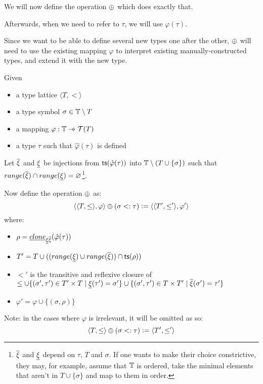 \documentclass[main.tex]{subfiles}
\begin{document}
We will now define the operation $\oplus$ which does exactly that.

Afterwards, when we need to refer to $\tau$, we will use $\varphi(\tau)$.

Since we want to be able to define several new types one after the other,
$\oplus$ will need to use the existing mapping $\varphi$ to interpret
existing manually-constructed types, and extend it with the new type.
\begin{defn}
    \label{def:subadd}
    Given
    \begin{itemize}
        \item a type lattice $\langle T, \less \rangle$
        \item a type symbol $\sigma \in \mathbb{T} \setminus T$
        \item a mapping $\varphi : \tsymbs \pfun \tclos{T}$
        \item a type $\tau$ such that $\hat{\varphi}(\tau)$ is defined
    \end{itemize}
    Let $\overline{\xi}$ and $\underline{\xi}$ be injections from
    $\mathsf{ts}(\hat{\varphi}(\tau))$ into $\mathbb{T} \setminus (T \cup \{ \sigma \})$ such that
    $range(\overline{\xi}) \cap range(\underline{\xi}) = \varnothing$\footnote{
        $\overline{\xi}$ and $\underline{\xi}$ depend on $\tau$, $T$ and
        $\sigma$. If one wants to make their choice constrictive, they may,
        for example, assume that $\mathbb{T}$ is ordered, take the minimal
        elements that aren't in $T \cup \{ \sigma \}$ and map to them in
        order.
    }.

    Now define the operation $\oplus$ as:
        \[ \langle \langle T, \leq \rangle, \varphi \rangle
            \oplus (\sigma <: \tau)
            \vcentcolon=
            \langle \langle T', \leq' \rangle, \varphi' \rangle
        \] where:
    \begin{itemize}
        \item $\rho = \underline{clone}_{\underline{\xi} \overline{\xi}}(\hat{\varphi}(\tau))$
        \item $T' = T \cup ((range(\underline{\xi}) \cup range(\overline{\xi})) \cap \mathsf{ts}(\rho))$
        \item $\less'$ is the transitive and reflexive closure of
            $\leq \cup \{ (\sigma', \tau') \in T' \times T \mid \underline{\xi}(\tau') = \sigma' \}
                   \cup \{ (\sigma', \tau') \in T \times T' \mid \overline{\xi}(\sigma') = \tau' \}$
        \item $\varphi' = \varphi \cup \{ (\sigma, \rho) \}$
    \end{itemize}

    Note: in the cases where $\varphi$ is irrelevant, it will be omitted as
    so:
    \[ \langle T, \leq \rangle
        \oplus (\sigma <: \tau)
        \vcentcolon=
        \langle T', \leq' \rangle
    \]
\end{defn}
\end{document}
